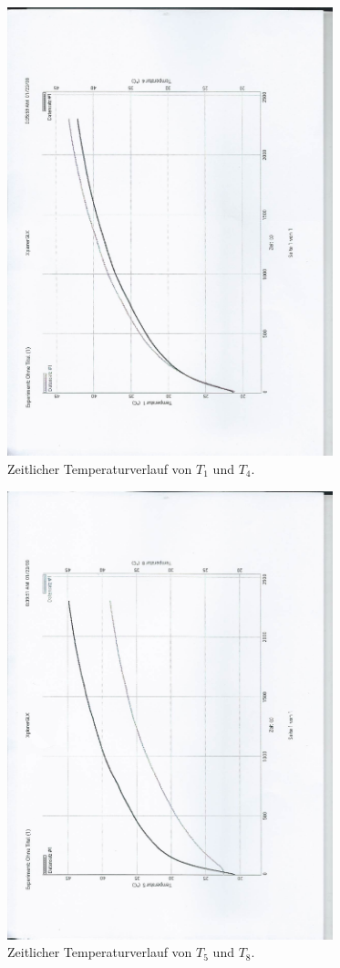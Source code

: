 \begin{figure}
  \centering
  \includegraphics[height=13cm, angle=270]{scan-7.jpg}
  \caption{Zeitlicher Temperaturverlauf von $T_1$ und $T_4$.}
  \label{fig:1}
\end{figure}

\begin{figure}[H]
  \centering
  \includegraphics[height=13cm, angle=270]{scan-6.jpg}
  \caption{Zeitlicher Temperaturverlauf von $T_5$ und $T_8$.}
  \label{fig:2}
\end{figure}

